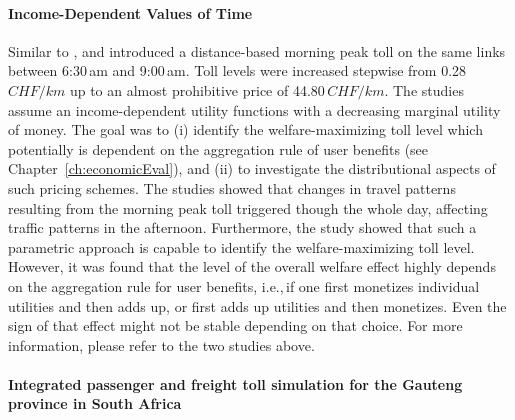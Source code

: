 
\paragraph{Income-Dependent Values of Time}

Similar to \cite{RieserEtAl_TRBTDF_2008}, \cite{KickhoeferEtAl2010EconomicEvaluationPublicAcceptanceRoadPricingKuhmo} and \cite{Kickhoefer_PhDThesis_2014} introduced a distance-based morning peak toll on the same links between 6:30\,am and 9:00\,am. Toll levels were increased stepwise from 0.28\,$CHF/km$ up to an almost prohibitive price of 44.80\,$CHF/km$. The studies assume an income-dependent utility functions with a decreasing marginal utility of money. The goal was to (i) identify the welfare-maximizing toll level which potentially is dependent on the aggregation rule of user benefits (see Chapter~\ref{ch:economicEval}), and (ii) to investigate the distributional aspects of such pricing schemes.
%
The studies showed that changes in travel patterns resulting from the morning peak toll triggered though the whole day, affecting traffic patterns in the afternoon.
%
Furthermore, the study showed that such a parametric approach is capable to identify the welfare-maximizing toll level. However, it was found that the level of the overall welfare effect highly depends on the aggregation rule for user benefits, i.e.,\,if one first monetizes individual utilities and then adds up, or first adds up utilities and then monetizes. 
Even the sign of that effect might not be stable depending on that choice.
%
For more information, please refer to the two studies above.



\paragraph{Integrated passenger and freight toll simulation for the Gauteng province in South Africa}

